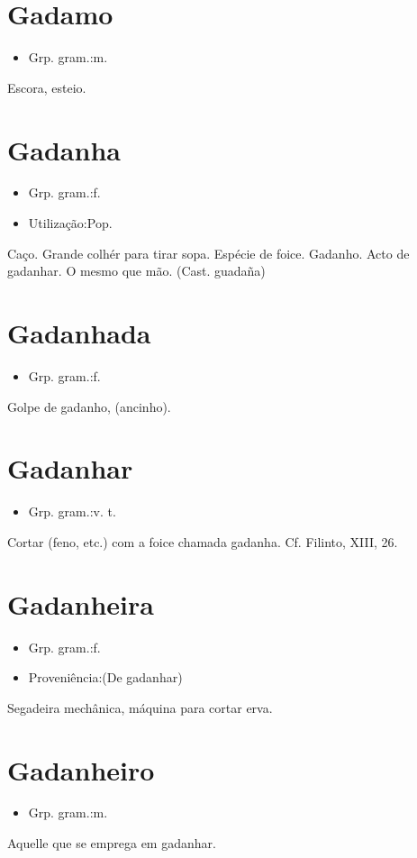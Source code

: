 \section{Gadamo}
\begin{itemize}
\item {Grp. gram.:m.}
\end{itemize}
Escora, esteio.
\section{Gadanha}
\begin{itemize}
\item {Grp. gram.:f.}
\end{itemize}
\begin{itemize}
\item {Utilização:Pop.}
\end{itemize}
Caço.
Grande colhér para tirar sopa.
Espécie de foice.
Gadanho.
Acto de gadanhar.
O mesmo que \textunderscore mão\textunderscore .
(Cast. \textunderscore guadaña\textunderscore )
\section{Gadanhada}
\begin{itemize}
\item {Grp. gram.:f.}
\end{itemize}
Golpe de gadanho, (ancinho).
\section{Gadanhar}
\begin{itemize}
\item {Grp. gram.:v. t.}
\end{itemize}
Cortar (feno, etc.) com a foice chamada \textunderscore gadanha\textunderscore . Cf. Filinto, XIII, 26.
\section{Gadanheira}
\begin{itemize}
\item {Grp. gram.:f.}
\end{itemize}
\begin{itemize}
\item {Proveniência:(De \textunderscore gadanhar\textunderscore )}
\end{itemize}
Segadeira mechânica, máquina para cortar erva.
\section{Gadanheiro}
\begin{itemize}
\item {Grp. gram.:m.}
\end{itemize}
Aquelle que se emprega em gadanhar.
